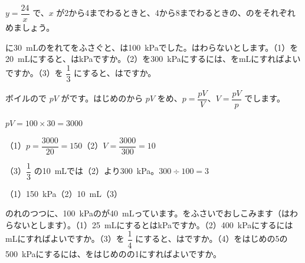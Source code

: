 \begin{jibun}
$y=\dfrac{24}{x}$ で、$x$ が2から4までわるときと、4から8までわるときの、のをそれぞれめましょう。
\end{jibun}

\begin{reidai}
に\qty{30}{mL}のをれてをふさぐと、は\qty{100}{kPa}でした。はわらないとします。（1）を\qty{20}{mL}にすると、はkPaですか。（2）を\qty{300}{kPa}にするには、をmLにすればよいですか。（3）を $\dfrac{1}{3}$ にすると、はですか。\par
\kangaekata ボイルので $pV$ がです。はじめのから $pV$ をめ、$p=\dfrac{pV}{V}$、$V=\dfrac{pV}{p}$ でします。\par
\shiki $pV=100\times30=3000$\par
\hspace*{2.6\zw}（1）\nobreak $p=\dfrac{3000}{20}=150$\qquad（2）\nobreak $V=\dfrac{3000}{300}=10$\par
\hspace*{2.6\zw}（3）\nobreak $\dfrac{1}{3}$ の\qty{10}{mL}では（2）より\qty{300}{kPa}。$300\div100=3$\par
\kotae（1）\nobreak\qty{150}{kPa}\quad（2）\nobreak\qty{10}{mL}\quad（3）
\end{reidai}

\begin{jibun}
のれのつつに、\qty{100}{kPa}のが\qty{40}{mL}っています。をふさいでおしこみます（はわらないとします）。（1）\qty{25}{mL}にするとはkPaですか。（2）\qty{400}{kPa}にするにはmLにすればよいですか。（3）を $\dfrac{1}{4}$ にすると、はですか。（4）をはじめの5の\qty{500}{kPa}にするには、をはじめのの1にすればよいですか。
\end{jibun}

